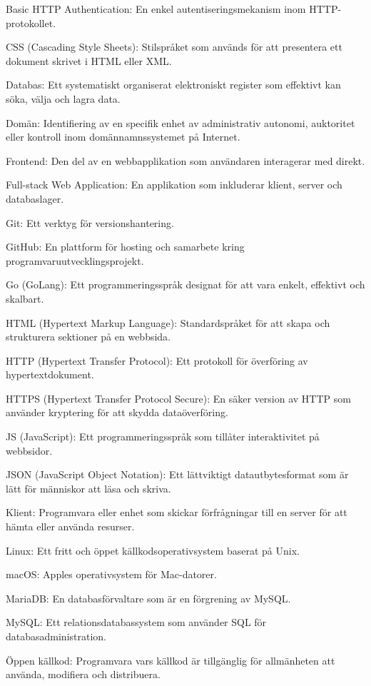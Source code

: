 Basic HTTP Authentication: En enkel autentiseringsmekanism inom HTTP-protokollet.

CSS (Cascading Style Sheets): Stilspråket som används för att presentera ett dokument skrivet i HTML eller XML.

Databas: Ett systematiskt organiserat elektroniskt register som effektivt kan söka, välja och lagra data.

Domän: Identifiering av en specifik enhet av administrativ autonomi, auktoritet eller kontroll inom domännamnssystemet på Internet.

Frontend: Den del av en webbapplikation som användaren interagerar med direkt.

Full-stack Web Application: En applikation som inkluderar klient, server och databaslager.

Git: Ett verktyg för versionshantering.

GitHub: En plattform för hosting och samarbete kring programvaruutvecklingsprojekt.

Go (GoLang): Ett programmeringsspråk designat för att vara enkelt, effektivt och skalbart.

HTML (Hypertext Markup Language): Standardspråket för att skapa och strukturera sektioner på en webbsida.

HTTP (Hypertext Transfer Protocol): Ett protokoll för överföring av hypertextdokument.

HTTPS (Hypertext Transfer Protocol Secure): En säker version av HTTP som använder kryptering för att skydda dataöverföring.

JS (JavaScript): Ett programmeringsspråk som tillåter interaktivitet på webbsidor.

JSON (JavaScript Object Notation): Ett lättviktigt datautbytesformat som är lätt för människor att läsa och skriva.

Klient: Programvara eller enhet som skickar förfrågningar till en server för att hämta eller använda resurser.

Linux: Ett fritt och öppet källkodsoperativsystem baserat på Unix.

macOS: Apples operativsystem för Mac-datorer.

MariaDB: En databasförvaltare som är en förgrening av MySQL.

MySQL: Ett relationsdatabassystem som använder SQL för databasadministration.

Öppen källkod: Programvara vars källkod är tillgänglig för allmänheten att använda, modifiera och distribuera.

